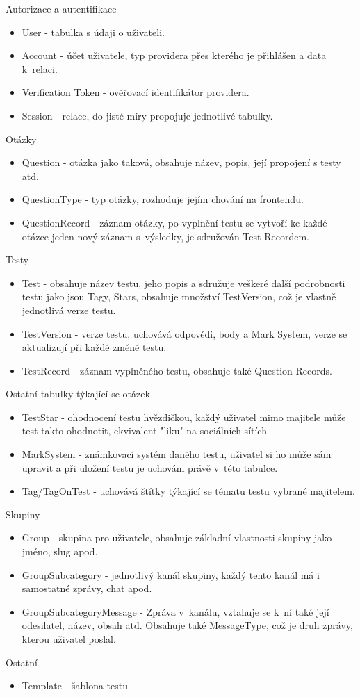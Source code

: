 \documentclass[12pt, a4paper,
openright
]{report}
\begin{document}
Autorizace a autentifikace
\begin{itemize}[itemsep=0pt]
	\item User - tabulka s údaji o uživateli.
	\item Account - účet uživatele, typ providera přes kterého je přihlášen a data k~relaci.
	\item Verification Token - ověřovací identifikátor providera.
	\item Session - relace, do jisté míry propojuje jednotlivé tabulky.
\end{itemize} 
Otázky
\begin{itemize}
	\item Question - otázka jako taková, obsahuje název, popis, její propojení s testy atd.
	\item QuestionType - typ otázky, rozhoduje jejím chování na frontendu.
	\item QuestionRecord - záznam otázky, po vyplnění testu se vytvoří ke každé otázce jeden nový záznam s~výsledky, je sdružován Test Recordem.
\end{itemize}
Testy
\begin{itemize}
	\item Test - obsahuje název testu, jeho popis a sdružuje veškeré další podrobnosti testu jako jsou Tagy, Stars, obsahuje množství TestVersion, což je vlastně jednotlivá verze testu.
	\item TestVersion - verze testu, uchovává odpovědi, body a Mark System, verze se aktualizují při každé změně testu.
	\item TestRecord - záznam vyplněného testu, obsahuje také Question Records.
\end{itemize}
Ostatní tabulky týkající se otázek
\begin{itemize}
	\item TestStar - ohodnocení testu hvězdičkou, každý uživatel mimo majitele může test takto ohodnotit, ekvivalent "liku" na sociálních sítích
	\item MarkSystem - známkovací systém daného testu, uživatel si ho může sám upravit a při uložení testu je uchovám právě v~této tabulce.
	\item Tag/TagOnTest - uchovává štítky týkající se tématu testu vybrané majitelem.
\end{itemize}
Skupiny
\begin{itemize}
	\item Group - skupina pro uživatele, obsahuje základní vlastnosti skupiny jako jméno, slug apod.
	\item GroupSubcategory - jednotlivý kanál skupiny, každý tento kanál má i samostatné zprávy, chat apod.
	\item GroupSubcategoryMessage - Zpráva v~kanálu, vztahuje se k~ní také její odesilatel, název, obsah atd. Obsahuje také MessageType, což je druh zprávy, kterou uživatel poslal.
\end{itemize}
Ostatní
\begin{itemize}
	\item Template - šablona testu
\end{itemize}
\end{document}
